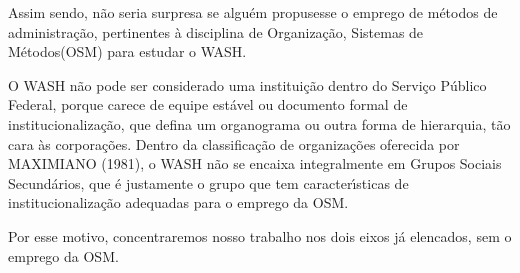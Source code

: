 \documentclass[
12pt,		%
openright,	%
twoside,  %
a4paper,			%
chapter=TITLE,		%
english,			%
french,				%
spanish,			%
brazil				%
]{USPSC-classe/USPSC}
\begin{document}
Assim sendo, n\~ao seria surpresa se algu\'em propusesse o emprego de m\'etodos de administra\c{c}\~ao, pertinentes \`a disciplina de \textquotedbl Organiza\c{c}\~ao, Sistemas de M\'etodos\textquotedbl  (OSM) para estudar o WASH.


















\noindent\begin{center}\mbox{\centering{}}\end{center}


O WASH n\~ao pode ser considerado uma institui\c{c}\~ao dentro do Servi\c{c}o P\'ublico Federal, porque carece de equipe est\'avel ou documento formal de institucionaliza\c{c}\~ao, que defina um organograma ou outra forma de hierarquia, t\~ao cara \`as corpora\c{c}\~oes. Dentro da classifica\c{c}\~ao de organiza\c{c}\~oes oferecida por MAXIMIANO (1981), o WASH n\~ao se encaixa integralmente em \textquotedbl Grupos Sociais Secund\'arios\textquotedbl , que \'e justamente o grupo que tem caracter\'{\i}sticas de institucionaliza\c{c}\~ao adequadas para o emprego da OSM.

















Por esse motivo, concentraremos nosso trabalho nos dois eixos j\'a elencados, sem o emprego da OSM.
\end{document}
